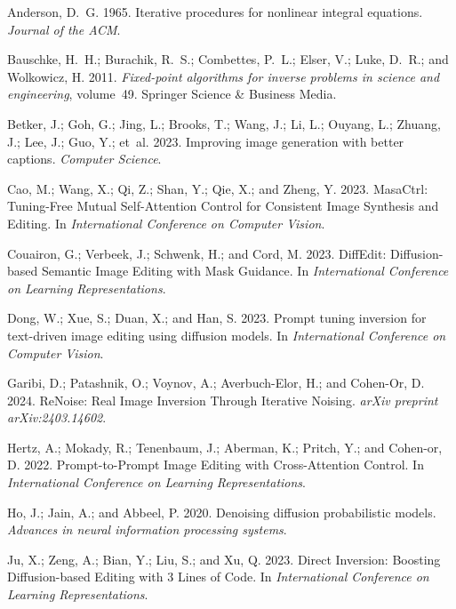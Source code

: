\documentclass[letterpaper]{article} \usepackage{aaai25}  \usepackage{times}  \usepackage{helvet}  \usepackage{courier}  \usepackage[hyphens]{url}  \usepackage{graphicx} \urlstyle{rm} \def\UrlFont{\rm}  \usepackage{natbib}  \usepackage{caption} \frenchspacing  \setlength{\pdfpagewidth}{8.5in} \setlength{\pdfpageheight}{11in} \usepackage{algorithm}
\begin{document}
\begin{thebibliography}{22}
\providecommand{\natexlab}[1]{#1}

Anderson, D.~G. 1965.
\newblock Iterative procedures for nonlinear integral equations.
\newblock \emph{Journal of the ACM}.

Bauschke, H.~H.; Burachik, R.~S.; Combettes, P.~L.; Elser, V.; Luke, D.~R.; and Wolkowicz, H. 2011.
\newblock \emph{Fixed-point algorithms for inverse problems in science and engineering}, volume~49.
\newblock Springer Science \& Business Media.

Betker, J.; Goh, G.; Jing, L.; Brooks, T.; Wang, J.; Li, L.; Ouyang, L.; Zhuang, J.; Lee, J.; Guo, Y.; et~al. 2023.
\newblock Improving image generation with better captions.
\newblock \emph{Computer Science}.

Cao, M.; Wang, X.; Qi, Z.; Shan, Y.; Qie, X.; and Zheng, Y. 2023.
\newblock MasaCtrl: Tuning-Free Mutual Self-Attention Control for Consistent Image Synthesis and Editing.
\newblock In \emph{International Conference on Computer Vision}.

Couairon, G.; Verbeek, J.; Schwenk, H.; and Cord, M. 2023.
\newblock DiffEdit: Diffusion-based Semantic Image Editing with Mask Guidance.
\newblock In \emph{International Conference on Learning Representations}.

Dong, W.; Xue, S.; Duan, X.; and Han, S. 2023.
\newblock Prompt tuning inversion for text-driven image editing using diffusion models.
\newblock In \emph{International Conference on Computer Vision}.

Garibi, D.; Patashnik, O.; Voynov, A.; Averbuch-Elor, H.; and Cohen-Or, D. 2024.
\newblock ReNoise: Real Image Inversion Through Iterative Noising.
\newblock \emph{arXiv preprint arXiv:2403.14602}.

Hertz, A.; Mokady, R.; Tenenbaum, J.; Aberman, K.; Pritch, Y.; and Cohen-or, D. 2022.
\newblock Prompt-to-Prompt Image Editing with Cross-Attention Control.
\newblock In \emph{International Conference on Learning Representations}.

Ho, J.; Jain, A.; and Abbeel, P. 2020.
\newblock Denoising diffusion probabilistic models.
\newblock \emph{Advances in neural information processing systems}.

Ju, X.; Zeng, A.; Bian, Y.; Liu, S.; and Xu, Q. 2023.
\newblock Direct Inversion: Boosting Diffusion-based Editing with 3 Lines of Code.
\newblock In \emph{International Conference on Learning Representations}.


\end{thebibliography}
\end{document}
